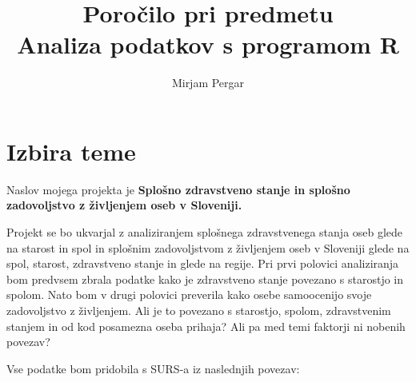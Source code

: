 \documentclass[11pt,a4paper]{article}
\begin{document}
\title{Poročilo pri predmetu \\
Analiza podatkov s programom R\\}

\author{Mirjam Pergar}
\clearpage\maketitle
\thispagestyle{empty}



\section{Izbira teme}

Naslov mojega projekta je \large\textbf{Splošno zdravstveno stanje in splošno zadovoljstvo z življenjem oseb v Sloveniji.}

Projekt se bo ukvarjal z analiziranjem splošnega zdravstvenega stanja oseb glede na starost in spol in splošnim zadovoljstvom z življenjem oseb v Sloveniji glede na spol, starost, zdravstveno stanje in glede na regije. Pri prvi polovici analiziranja bom predvsem zbrala podatke kako je zdravstveno stanje povezano s starostjo in spolom. Nato bom v drugi polovici preverila kako osebe samoocenijo svoje zadovoljstvo z življenjem. Ali je to povezano s starostjo, spolom, zdravstvenim stanjem in od kod posamezna oseba prihaja? Ali pa med temi faktorji ni nobenih povezav?

Vse podatke bom pridobila s SURS-a iz naslednjih povezav:
\end{document}
